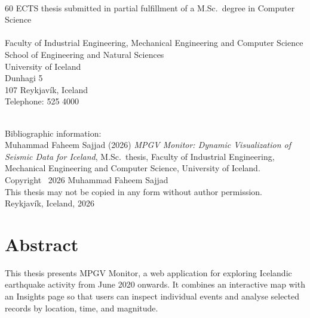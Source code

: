 \documentclass[12pt]{article}
\begin{document}

\clearpage
\thispagestyle{empty}
\vspace*{\fill}
\renewcommand{\baselinestretch}{1.5}\normalsize
{} \\
60 ECTS thesis submitted in partial fulfillment of a M.Sc.\ degree in Computer Science \\ \\
Faculty of Industrial Engineering, Mechanical Engineering and Computer Science \\
School of Engineering and Natural Sciences \\
University of Iceland \\
Dunhagi 5 \\
107 Reykjavík, Iceland \\
Telephone: 525 4000 \\ \\

\vspace*{\lineskip}

Bibliographic information: \\
Muhammad Faheem Sajjad (2026) \emph{MPGV Monitor: Dynamic Visualization of Seismic Data for Iceland}, M.Sc.\ thesis, Faculty of Industrial Engineering, Mechanical Engineering and Computer Science, University of Iceland.\\

Copyright \textcopyright~2026 Muhammad Faheem Sajjad \\
This thesis may not be copied in any form without author permission.\\

Reykjavík, Iceland, 2026 \\
\renewcommand{\baselinestretch}{1.0}\normalsize
\newpage

\hypersetup{pageanchor=true}
\setcounter{page}{5}  %

\section*{\huge Abstract}
This thesis presents MPGV Monitor, a web application for exploring Icelandic earthquake activity from June 2020 onwards. It combines an interactive map with an Insights page so that users can inspect individual events and analyse selected records by location, time, and magnitude.
\end{document}
